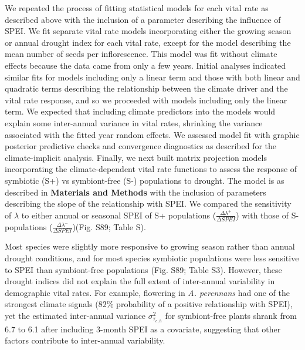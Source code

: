 \documentclass[lineno, sn-basic]{sn-jnl}%
\providecommand{\DIFadd}[1]{{\protect\color{blue}#1}} %
\providecommand{\DIFadd}[1]{{\protect\color{blue}\uwave{#1}}} %
\begin{document}
\DIFadd{We repeated the process of fitting statistical models for each vital rate as described above with the inclusion of a parameter describing the influence of SPEI. 
We fit separate vital rate models incorporating either the growing season or annual drought index for each vital rate, except for the model describing the mean number of seeds per inflorescence. 
This model was fit without climate effects because the data came from only a few years.
Initial analyses indicated similar fits for models including only a linear term and those with both linear and quadratic terms describing the relationship between the climate driver and the vital rate response, and so we proceeded with models including only the linear term.
We expected that including climate predictors into the models would explain some inter-annual variance in vital rates, shrinking the variance associated with the fitted year random effects.
We assessed model fit with graphic posterior predictive checks and convergence diagnostics as described for the climate-implicit analysis. 
Finally, we next built matrix projection models incorporating the climate-dependent vital rate functions to assess the response of symbiotic (S+) vs symbiont-free (S-) populations to drought. 
The model is as described in }\textbf{\DIFadd{Materials and Methods}} \DIFadd{with the inclusion of parameters describing the slope of the relationship with SPEI. 
We compared the sensitivity of $\lambda$ to either annual or seasonal SPEI of S+ populations ($\frac{\Delta\lambda^{+}}{\Delta SPEI}$) with those of S- populations ($\frac{\Delta\lambda^{-}}{\Delta SPEI}$)(Fig. S89; Table S).
}

\DIFadd{Most species were slightly more responsive to growing season rather than annual drought conditions, and for most species symbiotic populations were less sensitive to SPEI than symbiont-free populations (Fig. S89; Table S3).
However, these drought indices did not explain the full extent of inter-annual variability in demographic vital rates.
For example, flowering in }\emph{\DIFadd{A. perennans}} \DIFadd{had one of the strongest climate signals ($82\%$ probability of a positive relationship with SPEI), yet the estimated inter-annual variance $\sigma^2_{\tau_{e,h}}$ for symbiont-free plants shrank from 6.7 to 6.1 after including 3-month SPEI as a covariate, suggesting that other factors contribute to inter-annual variability.
}
\end{document}
